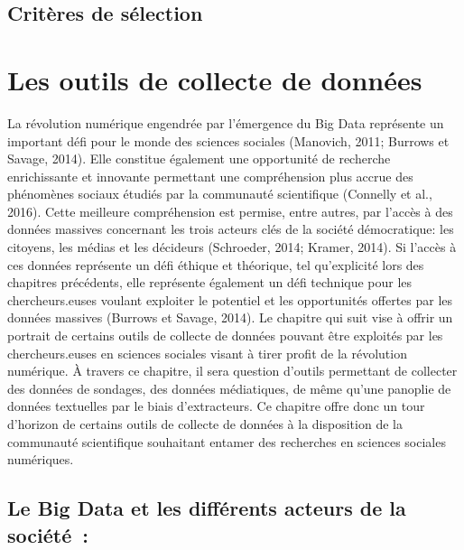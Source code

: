 \documentclass[
  letterpaper,
]{scrbook}
\begin{document}
\hypertarget{crituxe8res-de-suxe9lection}{%
\section{Critères de sélection}\label{crituxe8res-de-suxe9lection}}

\newpage{}


\hypertarget{les-outils-de-collecte-de-donnuxe9es}{%
\chapter{Les outils de collecte de
données}\label{les-outils-de-collecte-de-donnuxe9es}}

La révolution numérique engendrée par l'émergence du Big Data représente
un important défi pour le monde des sciences sociales (Manovich, 2011;
Burrows et Savage, 2014). Elle constitue également une opportunité de
recherche enrichissante et innovante permettant une compréhension plus
accrue des phénomènes sociaux étudiés par la communauté scientifique
(Connelly et al., 2016). Cette meilleure compréhension est permise,
entre autres, par l'accès à des données massives concernant les trois
acteurs clés de la société démocratique: les citoyens, les médias et les
décideurs (Schroeder, 2014; Kramer, 2014). Si l'accès à ces données
représente un défi éthique et théorique, tel qu'explicité lors des
chapitres précédents, elle représente également un défi technique pour
les chercheurs.euses voulant exploiter le potentiel et les opportunités
offertes par les données massives (Burrows et Savage, 2014). Le chapitre
qui suit vise à offrir un portrait de certains outils de collecte de
données pouvant être exploités par les chercheurs.euses en sciences
sociales visant à tirer profit de la révolution numérique. À travers ce
chapitre, il sera question d'outils permettant de collecter des données
de sondages, des données médiatiques, de même qu'une panoplie de données
textuelles par le biais d'extracteurs. Ce chapitre offre donc un tour
d'horizon de certains outils de collecte de données à la disposition de
la communauté scientifique souhaitant entamer des recherches en sciences
sociales numériques.

\hypertarget{le-big-data-et-les-diffuxe9rents-acteurs-de-la-sociuxe9tuxe9}{%
\section{\texorpdfstring{\textbf{Le Big Data et les différents acteurs
de la
société~:}}{Le Big Data et les différents acteurs de la société~:}}\label{le-big-data-et-les-diffuxe9rents-acteurs-de-la-sociuxe9tuxe9}}
\end{document}
